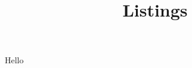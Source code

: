 \documentclass[russian,]{article}
\title{Listings}
\author{}
\begin{document}
Hello




\end{document}
